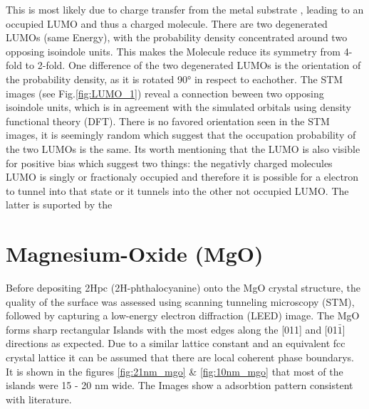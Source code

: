 \noindent This is most likely due to charge transfer from the metal substrate , leading to an occupied LUMO and thus a charged molecule.  
There are two degenerated LUMOs (same Energy), with the probability density concentrated around two opposing isoindole units. 
This makes the Molecule reduce its symmetry from 4-fold to 2-fold.
One difference of the two degenerated LUMOs is the orientation of the probability density, as it is rotated 90° in respect to eachother.
The STM images (see Fig.\ref{fig:LUMO_1}) reveal a connection beween two opposing isoindole units, which is in agreement  with the simulated orbitals using density functional theory (DFT).  
There is no favored orientation seen in the STM images, it is seemingly random which suggest that the occupation probability of the two LUMOs is the same. 
Its worth mentioning that the LUMO is also visible for positive bias which suggest two things: the negativly charged molecules LUMO is singly or fractionaly occupied and therefore it is possible for a electron to tunnel into that state or it tunnels into the other not occupied LUMO. 
The latter is suported by the 

\section{Magnesium-Oxide (MgO)}
Before depositing 2Hpc (2H-phthalocyanine) onto the MgO crystal structure, the quality of the surface was assessed using scanning tunneling microscopy (STM), followed by capturing a low-energy electron diffraction (LEED) image.
The MgO forms sharp rectangular Islands with the most edges along the [011] and [01$\bar{1}$] directions as expected.
Due to a similar lattice constant and an equivalent fcc crystal lattice it can be assumed that there are local coherent phase boundarys.
It is shown in the figures \ref{fig:21nm_mgo} \& \ref{fig:10nm_mgo} that most of the islands were 15 - 20 nm wide.
The Images show a adsorbtion pattern consistent with literature. 

